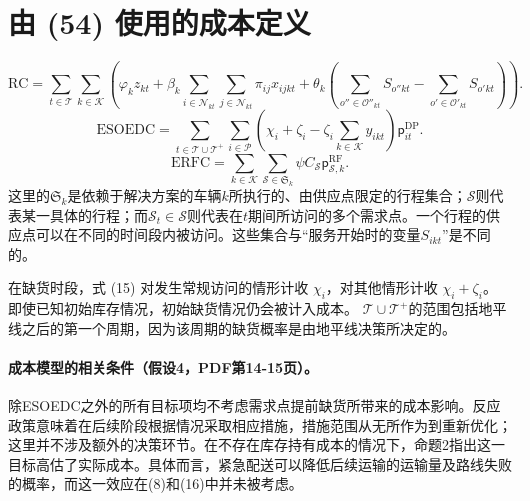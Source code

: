 \documentclass[10pt]{article}
\begin{document}
\section*{由 (54) 使用的成本定义}
\begin{equation}
\mathrm{RC}=\sum_{t\in\mathcal T}\sum_{k\in\mathcal K}
\left(\varphi_kz_{kt}+\beta_k\sum_{i\in\mathcal N_{kt}}\sum_{j\in\mathcal N_{kt}}\pi_{ij}x_{ijkt}
+\theta_k\left(\sum_{o''\in\mathcal O''_{kt}}S_{o''kt}-\sum_{o'\in\mathcal O'_{kt}}S_{o'kt}\right)\right).
\tag{13}
\end{equation}
\begin{equation}
\mathrm{ESOEDC}=\sum_{t\in\mathcal T\cup\mathcal T^+}\sum_{i\in\mathcal P}
\left(\chi_i+\zeta_i-\zeta_i\sum_{k\in\mathcal K}y_{ikt}\right)\mathsf p^{\mathrm{DP}}_{it}.
\tag{15}
\end{equation}
\begin{equation}
\mathrm{ERFC}=\sum_{k\in\mathcal K}\sum_{\mathcal S\in\mathfrak S_k}
\psi C_{\mathcal S}\mathsf p^{\mathrm{RF}}_{\mathcal S,k}.
\tag{16}
\end{equation}
这里的$\mathfrak S_k$是依赖于解决方案的车辆$k$所执行的、由供应点限定的行程集合；$\mathcal S$则代表某一具体的行程；而$\mathcal S_t\in\mathcal S$则代表在$t$期间所访问的多个需求点。一个行程的供应点可以在不同的时间段内被访问。这些集合与“服务开始时的变量$S_{ikt}$”是不同的。

在缺货时段，式 (15) 对发生常规访问的情形计收 $\chi_i$，对其他情形计收 $\chi_i+\zeta_i$。 即使已知初始库存情况，初始缺货情况仍会被计入成本。 $\mathcal T\cup\mathcal T^+$的范围包括地平线之后的第一个周期，因为该周期的缺货概率是由地平线决策所决定的。

\paragraph{成本模型的相关条件（假设4，PDF第14-15页）。}
除ESOEDC之外的所有目标项均不考虑需求点提前缺货所带来的成本影响。反应政策意味着在后续阶段根据情况采取相应措施，措施范围从无所作为到重新优化；这里并不涉及额外的决策环节。在不存在库存持有成本的情况下，命题2指出这一目标高估了实际成本。具体而言，紧急配送可以降低后续运输的运输量及路线失败的概率，而这一效应在(8)和(16)中并未被考虑。
\end{document}
